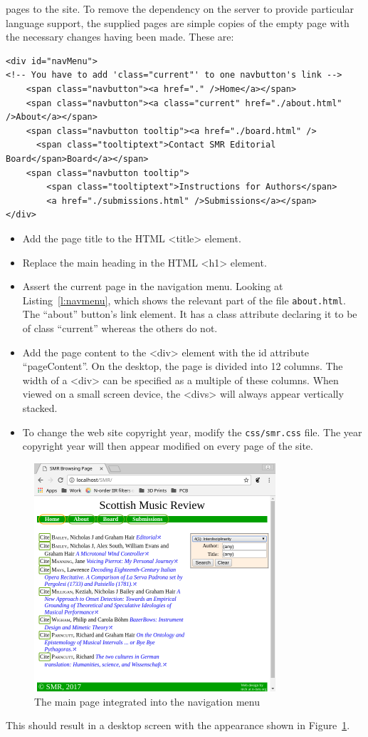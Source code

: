 \documentclass[a4paper,10pt]{SMR}
\begin{document}
pages to the site. To remove the dependency on the server to provide
particular language support, the supplied pages are simple copies of
the empty page with the necessary changes having been made. These are:
\begin{lstlisting}
<div id="navMenu">
<!-- You have to add 'class="current"' to one navbutton's link -->
	<span class="navbutton"><a href="." />Home</a></span>
	<span class="navbutton"><a class="current" href="./about.html" />About</a></span>
	<span class="navbutton tooltip"><a href="./board.html" />
	  <span class="tooltiptext">Contact SMR Editorial Board</span>Board</a></span>
	<span class="navbutton tooltip">
		<span class="tooltiptext">Instructions for Authors</span>
		<a href="./submissions.html" />Submissions</a></span>
</div>
\end{lstlisting}
\begin{itemize}
 \item Add the page title to the HTML <title> element.
 \item Replace the main heading in the HTML <h1> element.
 \item Assert the current page in the navigation menu. Looking at Listing~\ref{l:navmenu},
 which shows the relevant part of the file \texttt{about.html}. The ``about'' button's
 link element. It has a class attribute declaring it to be of class ``current''
 whereas the others do not.
 \item Add the page content to the <div> element with the id attribute ``pageContent''.
 On the desktop, the page is divided into 12 columns. The width of a <div> can
 be specified as a multiple of these columns. When viewed on a small screen
 device, the <divs> will always appear vertically stacked.
 \item To change the web site copyright year, modify the \texttt{css/smr.css} file.
 The year copyright year will then appear modified on every page of the site.
\end{itemize}

\begin{figure}
 \begin{center}
  \includegraphics[width=0.8\textwidth]{navbar.png}
 \end{center}
 \caption{The main page integrated into the navigation menu}
 \label{f:navbar}
\end{figure}

This should result in a desktop screen with the appearance shown in
Figure~\ref{f:navbar}.
\end{document}
